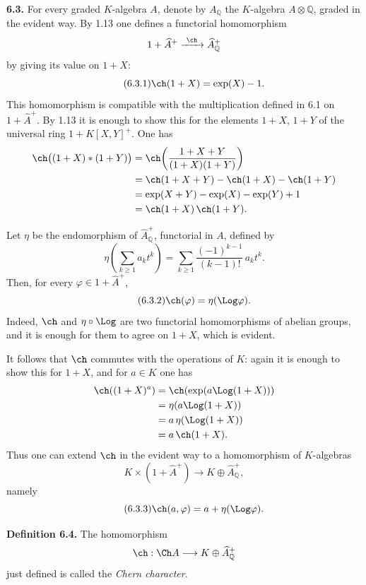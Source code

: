 \textbf{6.3.} For every graded \(K\)-algebra \(A\), denote by \(A_{\mathbb Q}\) the \(K\)-algebra \(A\otimes\mathbb Q\), graded in the evident way. By 1.13 one defines a functorial homomorphism
\[
  1+\widehat A^+\xrightarrow{\ \ch\ }\widehat A_{\mathbb Q}^{+}
\]
by giving its value on \(1+X\):
\begin{equation}\tag{6.3.1}
  \ch(1+X)=\exp(X)-1.
\end{equation}
This homomorphism is compatible with the multiplication defined in 6.1 on \(1+\widehat A^+\). By 1.13 it is enough to show this for the elements \(1+X\), \(1+Y\) of the universal ring \(1+K[X,Y]^+\). One has
\[
\begin{aligned}
 \ch\bigl((1+X)*(1+Y)\bigr)
 &= \ch\!\left(\frac{1+X+Y}{(1+X)(1+Y)}\right)\\
 &= \ch(1+X+Y)-\ch(1+X)-\ch(1+Y)\\
 &= \exp(X+Y)-\exp(X)-\exp(Y)+1\\
 &= \ch(1+X)\,\ch(1+Y).
\end{aligned}
\]

Let \(\eta\) be the endomorphism of \(\widehat A_{\mathbb Q}^{+}\), functorial in \(A\), defined by
\[
 \eta\!\left(\sum_{k\ge1} a_k t^k\right)
 =
 \sum_{k\ge1}\frac{(-1)^{k-1}}{(k-1)!}\,a_k t^k.
\]
Then, for every \(\varphi\in1+\widehat A^+\),
\begin{equation}\tag{6.3.2}
  \ch(\varphi)=\eta(\Log\varphi).
\end{equation}
Indeed, \(\ch\) and \(\eta\circ\Log\) are two functorial homomorphisms of abelian groups, and it is enough for them to agree on \(1+X\), which is evident.

It follows that \(\ch\) commutes with the operations of \(K\): again it is enough to show this for \(1+X\), and for \(a\in K\) one has
\[
\begin{aligned}
 \ch((1+X)^a)
 &=\ch(\exp(a\Log(1+X)))\\
 &=\eta(a\Log(1+X))\\
 &=a\,\eta(\Log(1+X))\\
 &=a\,\ch(1+X).
\end{aligned}
\]
Thus one can extend \(\ch\) in the evident way to a homomorphism of \(K\)-algebras
\[
  K\times(1+\widehat A^+)\longrightarrow K\oplus\widehat A_{\mathbb Q}^{+},
\]
namely
\begin{equation}\tag{6.3.3}
  \ch(a,\varphi)=a+\eta(\Log\varphi).
\end{equation}

\textbf{Definition 6.4.} The homomorphism
\[
  \ch:\Ch A\longrightarrow K\oplus\widehat A_{\mathbb Q}^{+}
\]
just defined is called the \emph{Chern character}.

